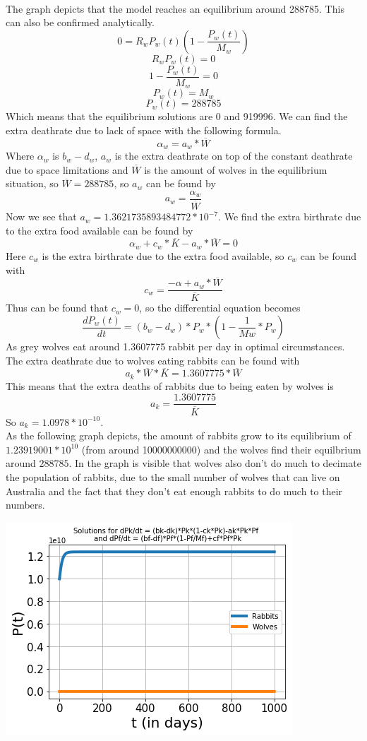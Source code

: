 \documentclass{article}
\begin{document}
\\
The graph depicts that the model reaches an equilibrium around 288785. This can also be confirmed analytically. 
$$0=R_wP_w(t)(1-\frac{P_w(t)}{M_w})$$
$$R_wP_w(t)=0$$
$$1-\frac{P_w(t)}{M_w}=0$$
$$P_w(t)=M_w$$
$$P_w(t)=288785$$
Which means that the equilibrium solutions are 0 and 919996. We can find the extra deathrate due to lack of space with the following formula.
$$\alpha_w = a_w*\overline{W}$$
Where $\alpha_w$ is $b_w-d_w$, $a_w$ is the extra deathrate on top of the constant deathrate due to space limitations and $\overline{W}$ is the amount of wolves in the equilibrium situation, so $\overline{W}=288785$, so $a_w$ can be found by
$$a_w = \frac{\alpha_w}{\overline{W}}$$
Now we see that $a_w=1.3621735893484772*10^{-7}$. We find the extra birthrate due to the extra food available can be found by
$$\alpha_w + c_w*\overline{K}-a_w*\overline{W}=0$$
Here $c_w$ is the extra birthrate due to the extra food available, so $c_w$ can be found with
$$c_w=\frac{-\alpha+a_w*\overline{W}}{\overline{K}}$$
Thus can be found that $c_w=0$, so the differential equation becomes
$$\frac{dP_w(t)}{dt}=(b_w-d_w)*P_w*(1-\frac{1}{Mw}*P_w)$$
As grey wolves eat around 1.3607775 rabbit per day in optimal circumstances. The extra deathrate due to wolves eating rabbits can be found with
$$a_k*\overline{W}*\overline{K}=1.3607775*\overline{W}$$
This means that the extra deaths of rabbits due to being eaten by wolves is 
$$a_k=\frac{1.3607775}{\overline{K}}$$
So $a_k=1.0978*10^{-10}$.
\\As the following graph depicts, the amount of rabbits grow to its equilibrium of $1.23919001*10^{10}$ (from around 10000000000) and the wolves find their equilbrium around $288785$. In the graph is visible that wolves also don't do much to decimate the population of rabbits, due to the small number of wolves that can live on Australia and the fact that they don't eat enough rabbits to do much to their numbers.
\begin{center}
    \includegraphics[scale=0.78]{Pictures/RabbitWolves.png}
\end{center}
\end{document}
